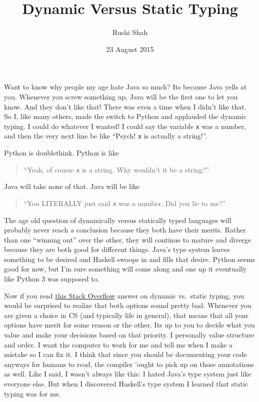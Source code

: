 \documentclass[12pt]{article}
\title{Dynamic Versus Static Typing}
\author{Rushi Shah}
\date{23 August 2015}
\begin{document}
  \maketitle

Want to know why people my age hate Java so much? Its because Java yells
at you. Whenever you screw something up, Java will be the first one to
let you know. And they don't like that! There was even a time when I
didn't like that. So I, like many others, made the switch to Python and
applauded the dynamic typing. I could do whatever I wanted! I could say
the variable \texttt{x} was a number, and then the very next line be
like ``Psych! \texttt{x} is actually a string!''.

Python is doublethink. Python is like 

\begin{quote}
``Yeah, of course \texttt{x} is a string. Why wouldn't it be a string?''
\end{quote}

Java will take none of that. Java will be like 

\begin{quote}
``You LITERALLY just said \texttt{x} was a number. Did you lie to me?''
\end{quote}

The age old question of dynamically versus statically typed languages
will probably never reach a conclusion because they both have their
merits. Rather than one ``winning out'' over the other, they will
continue to mature and diverge because they are both good for different
things. Java's type system leaves something to be desired and Haskell
swoops in and fills that desire. Python seems good for now, but I'm sure
something will come along and one up it eventually like Python 3 was
supposed to.

Now if you read \href{http://stackoverflow.com/a/125379/3861396}{this
Stack Overflow} answer on dynamic vs.~static typing, you would be
surprised to realize that both options sound pretty bad. Whenever you
are given a choice in CS (and typically life in general), that means
that all your options have merit for some reason or the other. Its up to
you to decide what you value and make your decisions based on that
priority. I personally value structure and order. I want the computer to
work for me and tell me when I make a mistake so I can fix it. I think
that since you should be documenting your code anyways for humans to
read, the compiler 'ought to pick up on those annotations as well. Like
I said, I wasn't always like this: I hated Java's type system just like
everyone else. But when I discovered Haskell's type system I learned
that static typing was for me.
\end{document}
